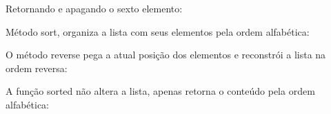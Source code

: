 \documentclass[letterpaper,10pt,brazil]{sphinxmanual}
\begin{document}
Retornando e apagando o sexto elemento:

\begin{sphinxVerbatim}[commandchars=\\\{\}]
\end{sphinxVerbatim}

\begin{sphinxVerbatim}[commandchars=\\\{\}]
\end{sphinxVerbatim}

Método sort, organiza a lista com seus elementos pela ordem alfabética:

\begin{sphinxVerbatim}[commandchars=\\\{\}]
\end{sphinxVerbatim}

\begin{sphinxVerbatim}[commandchars=\\\{\}]
\end{sphinxVerbatim}

O método reverse pega a atual posição dos elementos e reconstrói a lista
na ordem reversa:

\begin{sphinxVerbatim}[commandchars=\\\{\}]
\end{sphinxVerbatim}

\begin{sphinxVerbatim}[commandchars=\\\{\}]
\PYG{p}{[}     \PYG{p}{]}
\end{sphinxVerbatim}

A função sorted não altera a lista, apenas retorna o conteúdo pela ordem
alfabética:
\end{document}
